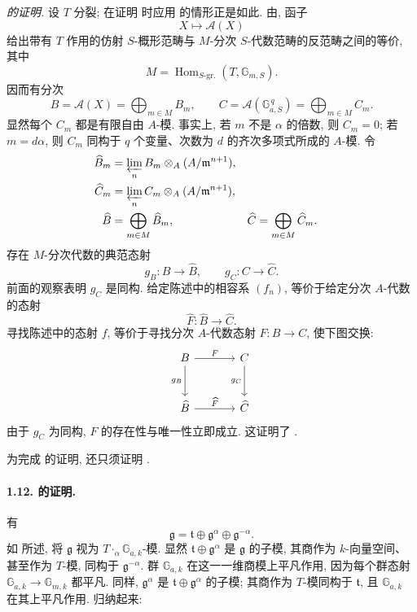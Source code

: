 \medskip
\noindent\emph{ 的证明.}
设 \(T\) 分裂; 在证明  时应用  的情形正是如此. 由, 函子
\[
  X\longmapsto\mathscr A(X)
\]
给出带有 \(T\) 作用的仿射 \(S\)-概形范畴与 \(M\)-分次 \(S\)-代数范畴的反范畴之间的等价, 其中
\[
  M=\operatorname{Hom}_{S\text{-gr.}}(T,\mathbb G_{m,S}).
\]
因而有分次
\[
  B=\mathscr A(X)=\bigoplus_{m\in M}B_m,
  \qquad
  C=\mathscr A(\mathbb G_{a,S}^{\,q})
    =\bigoplus_{m\in M}C_m.
\]
显然每个 \(C_m\) 都是有限自由 \(A\)-模. 事实上, 若 \(m\) 不是 \(\alpha\) 的倍数, 则 \(C_m=0\); 若 \(m=d\alpha\), 则 \(C_m\) 同构于 \(q\) 个变量、次数为 \(d\) 的齐次多项式所成的 \(A\)-模. 令
\[
\begin{aligned}
  \widehat B_m
    &=\varprojlim_n B_m\otimes_A(A/\mathfrak m^{n+1}),\\
  \widehat C_m
    &=\varprojlim_n C_m\otimes_A(A/\mathfrak m^{n+1}),\\
  \widehat B&=\bigoplus_{m\in M}\widehat B_m,
  &\widehat C&=\bigoplus_{m\in M}\widehat C_m.
\end{aligned}
\]
存在 \(M\)-分次代数的典范态射
\[
  g_B\colon B\longrightarrow\widehat B,
  \qquad
  g_C\colon C\longrightarrow\widehat C.
\]
前面的观察表明 \(g_C\) 是同构. 给定陈述中的相容系 \((f_n)\), 等价于给定分次 \(A\)-代数的态射
\[
  \widehat F\colon\widehat B\longrightarrow\widehat C.
\]
寻找陈述中的态射 \(f\), 等价于寻找分次 \(A\)-代数态射 \(F\colon B\to C\), 使下图交换:
\[
\begin{tikzcd}[column sep=large,row sep=large]
B \arrow[r,"F"] \arrow[d,"g_B"']
  & C \arrow[d,"g_C"']\\
\widehat B \arrow[r,"\widehat F"]
  & \widehat C
\end{tikzcd}
\]
由于 \(g_C\) 为同构, \(F\) 的存在性与唯一性立即成立. 这证明了 .

为完成  的证明, 还只须证明 .

\paragraph{\textbf{1.12.  的证明.}}
有
\[
  \mathfrak g
    =\mathfrak t\oplus\mathfrak g^\alpha\oplus\mathfrak g^{-\alpha}.
\]
如  所述, 将 \(\mathfrak g\) 视为 \(T\mathbin{\cdot_\alpha}\mathbb G_{a,k}\)-模. 显然 \(\mathfrak t\oplus\mathfrak g^\alpha\) 是 \(\mathfrak g\) 的子模, 其商作为 \(k\)-向量空间、甚至作为 \(T\)-模, 同构于 \(\mathfrak g^{-\alpha}\). 群 \(\mathbb G_{a,k}\) 在这一一维商模上平凡作用, 因为每个群态射 \(\mathbb G_{a,k}\to\mathbb G_{m,k}\) 都平凡. 同样, \(\mathfrak g^\alpha\) 是 \(\mathfrak t\oplus\mathfrak g^\alpha\) 的子模; 其商作为 \(T\)-模同构于 \(\mathfrak t\), 且 \(\mathbb G_{a,k}\) 在其上平凡作用. 归纳起来:

